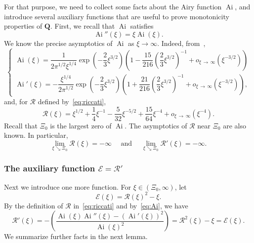 \documentclass[AHL,Unicode,longabstracts]{cedram}
\DeclareMathOperator{\Ai}{Ai}
\newcommand{\bQ}{\mathbf{Q}}
\newcommand{\mE}{\mathcal{E}}
\newcommand{\mR}{\mathcal{R}}
\newcommand{\1}{\mathds{1}}
\begin{document}
For that purpose, we need to collect some facts about the Airy function $\Ai$, and introduce several auxiliary functions that are useful to prove monotonicity properties of $\bQ$. First, we recall that $\Ai$ satisfies
\begin{equation}\label{eq:Ai}
\Ai''(\xi)=\xi\Ai(\xi).
\end{equation}
We know the precise asymptotics of $\Ai$ as $\xi \to \infty$. Indeed, from~\cite[Equations~10.4.59, 10.4.61]{AbramowitzStegun},
\begin{equation*}
\begin{cases}
\Ai(\xi) = \dfrac{1}{2\pi^{1/2}\xi^{1/4}} \exp\left(-\dfrac23 \xi^{3/2}\right)
\left (1 - \dfrac{15}{216} \left (\dfrac23 \xi^{3/2} \right)^{-1} + o_{\xi\,\to\,\infty}\left(\xi^{-3/2} \right)\right)
\\[0.10em]
\Ai'(\xi) = -\dfrac{\xi^{1/4}}{2\pi^{1/2}} \exp\left(-\dfrac23 \xi^{3/2}\right)
\left(1 + \dfrac{21}{216} \left(\dfrac23 \xi^{3/2} \right)^{-1} + o_{\xi\,\to\,\infty}\left(\xi^{-3/2} \right)\right),
\end{cases}
\end{equation*}
and, for $\mR$ defined by~\eqref{eq:riccati},
\begin{equation}\label{eq:R asymptotics}
\mR(\xi) = \xi^{1/2} + \frac14 \xi^{-1} - \frac{5}{32}\xi^{-5/2} + \frac{15}{64 }\xi^{-4} + o_{\xi\,\to\,\infty}\left(\xi^{-4}\right).
\end{equation}
Recall that $\Xi_0$ is the largest zero of $\Ai$. The asymptotics of $\mR$ near $\Xi_0$ are also known. In particular,
\begin{equation*}
\lim_{\xi \searrow \Xi_0} \mR(\xi) = -\infty
\quad \text{ and } \quad
\lim_{\xi \searrow \Xi_0} \mR'(\xi) = -\infty.
\end{equation*}

\subsubsection{The auxiliary function \texorpdfstring{$\mE = \mR'$}{mE = mR'}} Next we introduce one more function. For $\xi\in (\Xi_0, \infty)$, let
\[
\mE(\xi) = \mR(\xi)^2 - \xi.
\]
By the definition of $\mR$ in~\eqref{eq:riccati} and by~\eqref{eq:Ai}, we have
\begin{equation}\label{eq:R' and E}
\mR'(\xi) = -\left(\frac{\Ai(\xi)\Ai''(\xi) - (\Ai'(\xi))^2}{\Ai(\xi)^2}\right) = \mR^2(\xi)-\xi= \mE(\xi).
\end{equation}
We summarize further facts in the next lemma.
\end{document}
